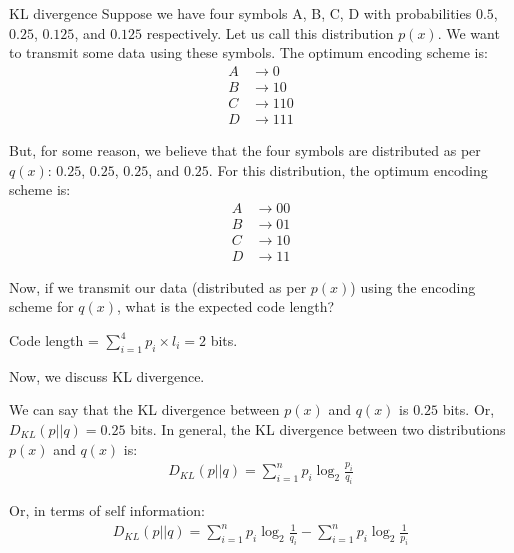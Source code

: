\documentclass[handout]{beamer}
\begin{document}
    \begin{frame}{KL divergence}
        Suppose we have four symbols A, B, C, D with probabilities $0.5$, $0.25$, $0.125$, and $0.125$ respectively. Let us call this distribution $p(x)$.
        We want to transmit some data using these symbols. 
        The optimum encoding scheme is:
        \begin{align*}
            A &\rightarrow 0 \\
            B &\rightarrow 10 \\
            C &\rightarrow 110 \\
            D &\rightarrow 111
        \end{align*}
            
        But, for some reason, we believe that the four symbols are distributed as per $q(x)$: $0.25$, $0.25$, $0.25$, and $0.25$. For this distribution, the optimum encoding scheme is:
        \begin{align*}
            A &\rightarrow 00 \\
            B &\rightarrow 01 \\
            C &\rightarrow 10 \\
            D &\rightarrow 11
        \end{align*}

        Now, if we transmit our data (distributed as per $p(x)$) using the encoding scheme for $q(x)$, what is the expected code length?

        Code length = $\sum_{i=1}^4 p_i \times l_i  = 2$ bits.

        \pause 
        Now, we discuss KL divergence.

        We can say that the KL divergence between $p(x)$ and $q(x)$ is $0.25$ bits. Or, $D_{KL}(p||q) = 0.25$ bits.
        In general, the KL divergence between two distributions $p(x)$ and $q(x)$ is:
        \begin{align*}
            D_{KL}(p||q) = \sum_{i=1}^n p_i \log_2 \frac{p_i}{q_i}
        \end{align*}

        Or, in terms of self information:
        \begin{align*}
            D_{KL}(p||q) = \sum_{i=1}^n p_i \log_2 \frac{1}{q_i} - \sum_{i=1}^n p_i \log_2 \frac{1}{p_i}
        \end{align*}
        
    
    \end{frame}
\end{document}
